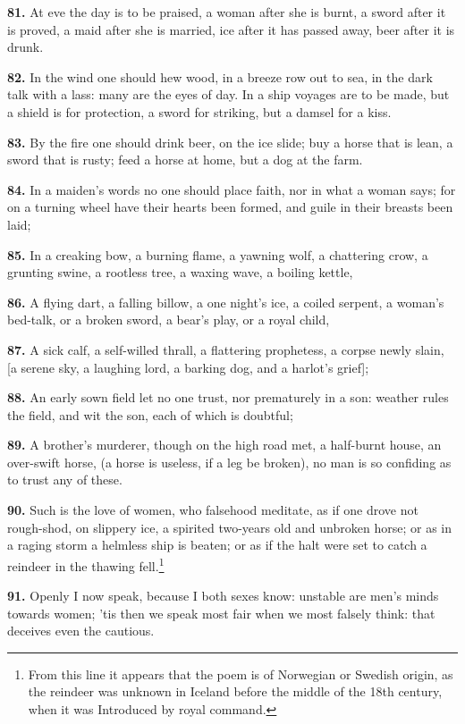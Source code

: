 \textbf{81.} At eve the day is to be praised, a woman after she is burnt, a
sword after it is proved, a maid after she is married, ice after it
has passed away, beer after it is drunk.

\textbf{82.} In the wind one should hew wood, in a breeze row out to sea, in
the dark talk with a lass: many are the eyes of day. In a ship voyages
are to be made, but a shield is for protection, a sword for striking,
but a damsel for a kiss.

\textbf{83.} By the fire one should drink beer, on the ice slide; buy a horse
that is lean, a sword that is rusty; feed a horse at home, but a dog
at the farm.

\textbf{84.} In a maiden's words no one should place faith, nor in what a
woman says; for on a turning wheel have their hearts been formed, and
guile in their breasts been laid;

\textbf{85.} In a creaking bow, a burning flame, a yawning wolf, a chattering
crow, a grunting swine, a rootless tree, a waxing wave, a boiling
kettle,

\textbf{86.} A flying dart, a falling billow, a one night's ice, a coiled
serpent, a woman's bed-talk, or a broken sword, a bear's play, or a
royal child,

\textbf{87.} A sick calf, a self-willed thrall, a flattering prophetess, a
corpse newly slain, [a serene sky, a laughing lord, a barking dog, and
a harlot's grief];

\textbf{88.} An early sown field let no one trust, nor prematurely in a son:
weather rules the field, and wit the son, each of which is doubtful;

\textbf{89.} A brother's murderer, though on the high road met, a half-burnt
house, an over-swift horse, (a horse is useless, if a leg be broken),
no man is so confiding as to trust any of these.

\textbf{90.} Such is the love of women, who falsehood meditate, as if one
drove not rough-shod, on slippery ice, a spirited two-years old and
unbroken horse; or as in a raging storm a helmless ship is beaten; or
as if the halt were set to catch a reindeer in the thawing fell.\footnote{From this line it appears that the poem is of Norwegian
or Swedish origin, as the reindeer was unknown in Iceland before the
middle of the 18th century, when it was Introduced by royal command.}

\textbf{91.} Openly I now speak, because I both sexes know: unstable are
men's minds towards women; 'tis then we speak most fair when we most
falsely think: that deceives even the cautious.

